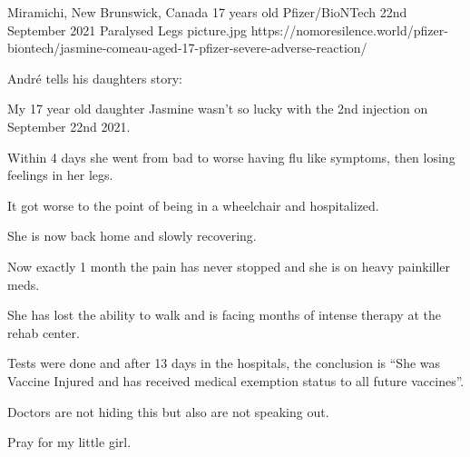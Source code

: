{Miramichi, New Brunswick, Canada}
{17 years old}
{Pfizer/BioNTech}
{22nd September 2021}
{Paralysed Legs}
{picture.jpg}
{https://nomoresilence.world/pfizer-biontech/jasmine-comeau-aged-17-pfizer-severe-adverse-reaction/}
{

André tells his daughters story:

My 17 year old daughter Jasmine wasn’t so lucky with the 2nd injection on
September 22nd 2021.

Within 4 days she went from bad to worse having flu like symptoms, then losing
feelings in her legs.

It got worse to the point of being in a wheelchair and hospitalized.

She is now back home and slowly recovering.

Now exactly 1 month the pain has never stopped and she is on heavy painkiller
meds.

She has lost the ability to walk and is facing months of intense therapy at the
rehab center.

Tests were done and after 13 days in the hospitals, the conclusion is “She was
Vaccine Injured and has received medical exemption status to all future
vaccines”.

Doctors are not hiding this but also are not speaking out.

Pray for my little girl.

}
